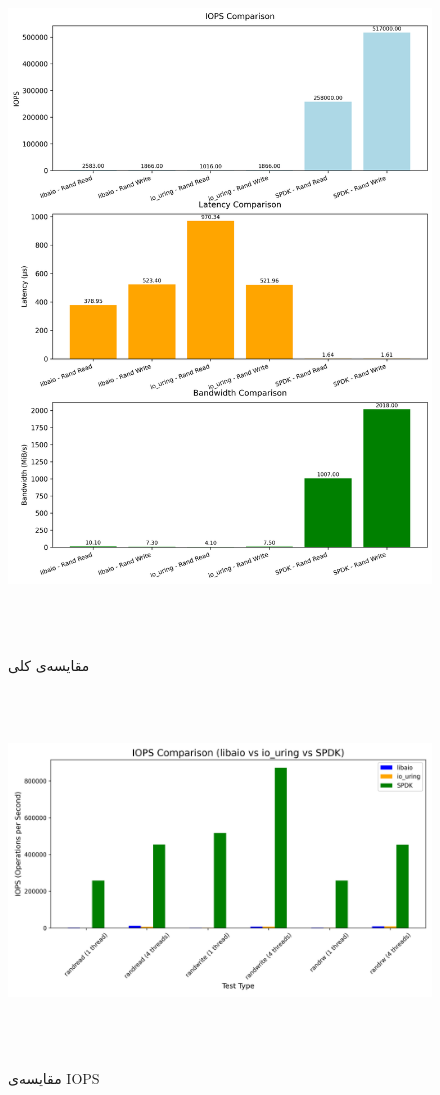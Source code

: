 ‫
‫
‫\begin{figure}[H]
‫    \centering
‫    \includegraphics[width=\textwidth]{figs/Overview.png}
‫    \caption{مقایسه‌ی کلی}
‫\end{figure}
‫
‫
‫\begin{figure}[H]
‫    \centering
‫    \includegraphics[width=\textwidth]{figs/iops_comparison.png}
‫    \caption{مقایسه‌ی IOPS}
‫\end{figure}
